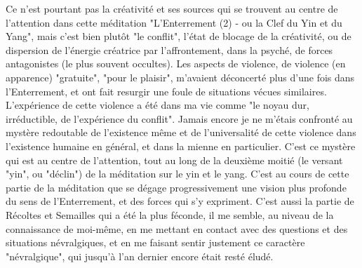 Ce n'est pourtant pas la créativité et ses sources qui se trouvent au centre de l'attention dans cette méditation "L'Enterrement (2) - ou la Clef du Yin et du Yang", mais c'est bien plutôt "le conflit", l'état de blocage de la créativité, ou de dispersion de l'énergie créatrice par l'affrontement, dans la psyché, de forces antagonistes (le plus souvent occultes). Les aspects de violence, de violence (en apparence) "gratuite", "pour le plaisir", m'avaient déconcerté plus d'une fois dans l'Enterrement, et ont fait resurgir une foule de situations vécues similaires. L'expérience de cette violence a été dans ma vie comme "le noyau dur, irréductible, de l'expérience du conflit". Jamais encore je ne m'étais confronté au mystère redoutable de l'existence même et de l'universalité de cette violence dans l'existence humaine en général, et dans la mienne en particulier. C'est ce mystère qui est au centre de l'attention, tout au long de la deuxième moitié (le versant "yin", ou "déclin") de la méditation sur le yin et le yang. C'est au cours de cette partie de la méditation que se dégage progressivement une vision plus profonde du sens de l'Enterrement, et des forces qui s'y expriment. C'est aussi la partie de Récoltes et Semailles qui a été la plus féconde, il me semble, au niveau de la connaissance de moi-même, en me mettant en contact avec des questions et des situations névralgiques, et en me faisant sentir justement ce caractère "névralgique", qui jusqu'à l'an dernier encore était resté éludé.


